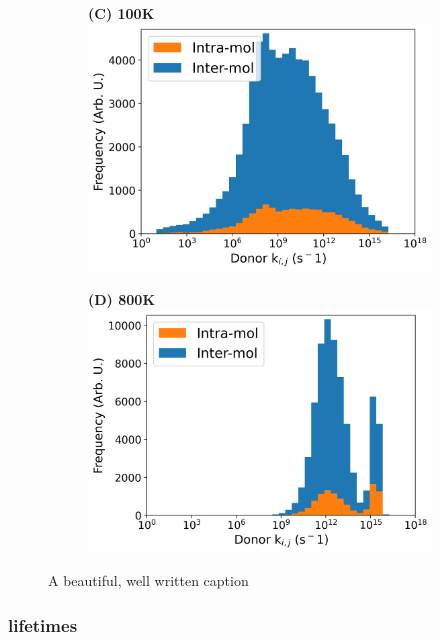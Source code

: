 \begin{figure}[]
\begin{subfigure}{.5\textwidth}
    \newline
\end{subfigure}
\begin{subfigure}{.5\textwidth}
    \textbf{(C) 100K}
    \centering
    \includegraphics[width=\textwidth]{figures/donor_hopping_rate_clusters_temp100.png}
\end{subfigure}%
\begin{subfigure}{.5\textwidth}
    \textbf{(D) 800K}
    \centering
    \includegraphics[width=\textwidth]{figures/donor_hopping_rate_clusters_temp800.png}
\end{subfigure}
\caption[short]{A beautiful, well written caption}
\end{figure}

\subsubsection{lifetimes}

